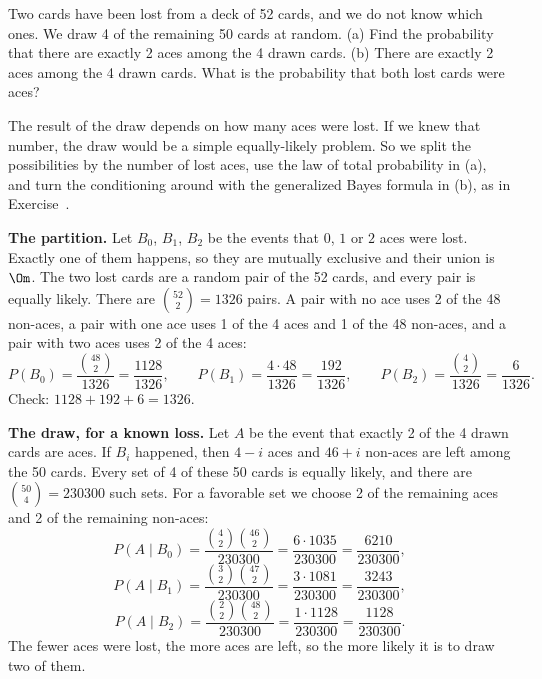 
\begin{problem}
	Two cards have been lost from a deck of 52 cards, and we do not know which
	ones. We draw 4 of the remaining 50 cards at random.
	(a) Find the probability that there are exactly 2 aces among the 4 drawn
	cards.
	(b) There are exactly 2 aces among the 4 drawn cards. What is the
	probability that both lost cards were aces?
\end{problem}

\begin{solution}
	\idea The result of the draw depends on how many aces were lost. If we knew
	that number, the draw would be a simple equally-likely problem. So we split
	the possibilities by the number of lost aces, use the law of total
	probability in (a), and turn the conditioning around with the generalized
	Bayes formula in (b), as in Exercise~.

	\textbf{The partition.} Let $B_0$, $B_1$, $B_2$ be the events that $0$, $1$
	or $2$ aces were lost. Exactly one of them happens, so they are mutually
	exclusive and their union is $\Om$. The two lost cards are a random pair of
	the 52 cards, and every pair is equally likely. There are
	$\binom{52}{2}=1326$ pairs. A pair with no ace uses 2 of the 48 non-aces, a
	pair with one ace uses 1 of the 4 aces and 1 of the 48 non-aces, and a pair
	with two aces uses 2 of the 4 aces:
	\[ P(B_0)=\frac{\binom{48}{2}}{1326}=\frac{1128}{1326},\qquad
		P(B_1)=\frac{4\cdot48}{1326}=\frac{192}{1326},\qquad
		P(B_2)=\frac{\binom{4}{2}}{1326}=\frac{6}{1326}. \]
	Check: $1128+192+6=1326$.

	\textbf{The draw, for a known loss.} Let $A$ be the event that exactly 2 of
	the 4 drawn cards are aces. If $B_i$ happened, then $4-i$ aces and $46+i$
	non-aces are left among the 50 cards. Every set of 4 of these 50 cards is
	equally likely, and there are $\binom{50}{4}=230300$ such sets. For a
	favorable set we choose 2 of the remaining aces and 2 of the remaining
	non-aces:
	\[ P(A\mid B_0)=\frac{\binom{4}{2}\binom{46}{2}}{230300}
		=\frac{6\cdot1035}{230300}=\frac{6210}{230300}, \]
	\[ P(A\mid B_1)=\frac{\binom{3}{2}\binom{47}{2}}{230300}
		=\frac{3\cdot1081}{230300}=\frac{3243}{230300}, \]
	\[ P(A\mid B_2)=\frac{\binom{2}{2}\binom{48}{2}}{230300}
		=\frac{1\cdot1128}{230300}=\frac{1128}{230300}. \]
	The fewer aces were lost, the more aces are left, so the more likely it is
	to draw two of them.


\end{solution}

